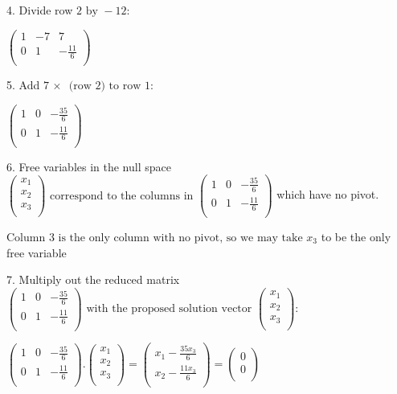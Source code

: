 \documentclass{article}
\begin{document}
4. Divide row $2\text{ by }-12:$

$\left(
\begin{array}{ccc}
1 & -7 & 7 \\
 0 & 1 & -\frac{11}{6} \\
\end{array}
\right)$

5. Add $7\, \times \,\text{ (row }2)\text{ to row }1:$

$\left(
\begin{array}{ccc}
1 & 0 & -\frac{35}{6} \\
 0 & 1 & -\frac{11}{6} \\
\end{array}
\right)$

6. Free variables in the null space $\left(
\begin{array}{c}
x_1 \\
 x_2 \\
 x_3 \\
\end{array}
\right)\text{ correspond to the columns in }\left(
\begin{array}{ccc}
1 & 0 & -\frac{35}{6} \\
 0 & 1 & -\frac{11}{6} \\
\end{array}
\right)$ which have no pivot.

Column $3\text{ is the only column with no pivot, so we may take }x_3$ to be the only free variable

7. Multiply out the reduced matrix $\left(
\begin{array}{ccc}
1 & 0 & -\frac{35}{6} \\
 0 & 1 & -\frac{11}{6} \\
\end{array}
\right)\text{ with the proposed solution vector }\left(
\begin{array}{c}
x_1 \\
 x_2 \\
 x_3 \\
\end{array}
\right):$

$\left(
\begin{array}{ccc}
1 & 0 & -\frac{35}{6} \\
 0 & 1 & -\frac{11}{6} \\
\end{array}
\right).\left(
\begin{array}{c}
x_1 \\
 x_2 \\
 x_3 \\
\end{array}
\right)=\left(
\begin{array}{c}
x_1-\frac{35 x_3}{6} \\
 x_2-\frac{11 x_3}{6} \\
\end{array}
\right)=\left(
\begin{array}{c}
0 \\
 0 \\
\end{array}
\right)$
\end{document}
